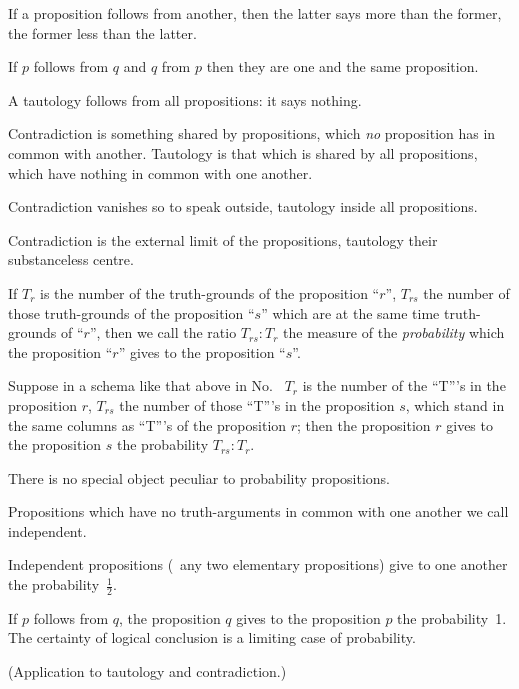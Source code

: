 {If a proposition follows from another, then the
latter says more than the former, the former less
than the latter.}


{If $p$ follows from $q$ and $q$ from $p$ then they are
one and the same proposition.}


{A tautology follows from all propositions: it
says nothing.}


{Contradiction is something shared by propositions,
which \emph{no} proposition has in common with
another. Tautology is that which is shared by
all propositions, which have nothing in common
with one another.

Contradiction vanishes so to speak outside,
tautology inside all propositions.

Contradiction is the external limit of the propositions,
tautology their substanceless centre.}


{If $T_{r}$ is the number of the truth-grounds of the
proposition ``$r$'', $T_{rs}$ the number of those truth-grounds
of the proposition ``$s$'' which are at the
same time truth-grounds of ``$r$'', then we call the
ratio $T_{rs} : T_{r}$ the measure of the \emph{probability} which
the proposition ``$r$'' gives to the proposition ``$s$''.}


{Suppose in a schema like that above in No.~
$T_{r}$ is the number of the ``T'''s in the proposition
$r$, $T_{rs}$ the number of those ``T'''s in
the proposition $s$, which stand in the same columns
as ``T'''s of the proposition $r$; then the proposition
$r$ gives to the proposition $s$ the probability
$T_{rs} : T_{r}$.}


{There is no special object peculiar to probability
propositions.}


{Propositions which have no truth-arguments
in common with one another we call independent.
\enlargethispage{-3pt} %

Independent propositions (\exempliGratia\ any two elementary
propositions) give to one another the probability~$\frac{1}{2}$.

If $p$ follows from $q$, the proposition $q$ gives
to the proposition $p$ the probability~1. The
certainty of logical conclusion is a limiting case
of probability.

(Application to tautology and contradiction.)}


